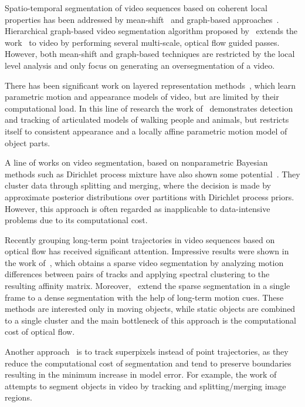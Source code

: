 Spatio-temporal segmentation of video sequences based on coherent local properties has been addressed by mean-shift~\cite{Dementhon02,WangTXC04,Paris08} and graph-based approaches~\cite{Grundmann10}. 
Hierarchical graph-based video segmentation algorithm proposed by~\cite{Grundmann10} extends the work~\cite{Felzenszwalb04} 
to video by performing several multi-scale, optical flow guided passes. However, both mean-shift and graph-based techniques are restricted by the local level analysis
and only focus on generating an oversegmentation of a video.

There has been significant work on layered representation methods~\cite{TorrSA01,XiaoS05,Kannan05,Kumar08}, which learn parametric motion and appearance models of video, but are limited by their computational load. 
In this line of research the work of~\cite{Kumar08} demonstrates detection and tracking of articulated models of walking people and animals, but restricts itself to consistent appearance and a locally affine parametric
motion model of object parts.

A line of works on video segmentation, based on nonparametric Bayesian methods such as Dirichlet process mixture have also shown some potential~\cite{OrbanzBB07,LeeKHC12}. 
They cluster data through splitting and merging, where the decision is made by approximate posterior distributions over partitions with Dirichlet process priors. However, this approach is
often regarded as inapplicable to data-intensive problems due to its computational cost.

Recently grouping long-term point trajectories in video sequences based on optical flow has received significant attention. Impressive results were shown in the work of~\cite{Brox10}, 
which obtains a sparse video segmentation by analyzing motion differences between pairs of tracks and applying spectral clustering to the resulting affinity matrix.
Moreover,~\cite{Ochs11,Ochs14} extend the sparse segmentation in a single frame to a dense segmentation with the help of long-term motion cues.
These methods are interested only in moving objects, while static objects are combined to a single cluster and the main bottleneck of this approach is the computational cost of optical flow.

Another approach~\cite{Brendel09,Vazquez_Reina10,Galasso11,GalassoCS12} is to track superpixels instead of point trajectories, as they reduce the
computational cost of segmentation and tend to preserve boundaries resulting in the minimum increase in model error. For example, the work of~\cite{Brendel09} attempts to segment objects in video by tracking and 
splitting/merging image regions. 

